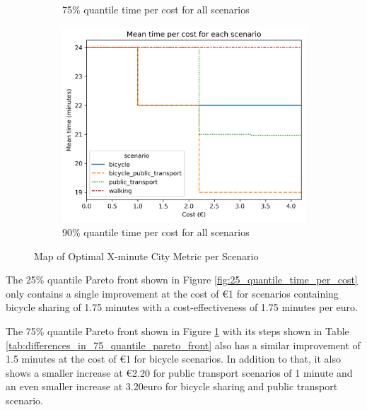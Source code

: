 \begin{figure}
\begin{subfigure}[b]{0.48\textwidth}
         \caption{75\% quantile time per cost for all scenarios}
         \label{fig:75_quantile_time_per_cost}
     \end{subfigure}
     \hfill
     \begin{subfigure}[b]{0.48\textwidth}
         \centering
         \includegraphics[width=\textwidth]{Figures/results/metric_cost/quantile_90_time_per_cost_for_each_scenario_without_car.png}
         \caption{90\% quantile time per cost for all scenarios}
         \label{fig:90_quantile_time_per_cost}
     \end{subfigure}
        \caption{Map of Optimal X-minute City Metric per Scenario}
        \label{fig:quantile_time_per_cost}
\end{figure}

The 25\% quantile Pareto front shown in Figure \ref{fig:25_quantile_time_per_cost} only contains a single improvement at the cost of \euro{1} for scenarios containing bicycle sharing of 1.75 minutes with a cost-effectiveness of 1.75 minutes per euro.


The 75\% quantile Pareto front shown in Figure \ref{fig:75_quantile_time_per_cost} with its steps shown in Table \ref{tab:differences_in_75_quantile_pareto_front} also has a similar improvement of 1.5 minutes at the cost of \euro{1} for bicycle scenarios.
In addition to that, it also shows a smaller increase at \euro{2.20} for public transport scenarios of 1 minute and an even smaller increase at 3.20euro for bicycle sharing and public transport scenario.

